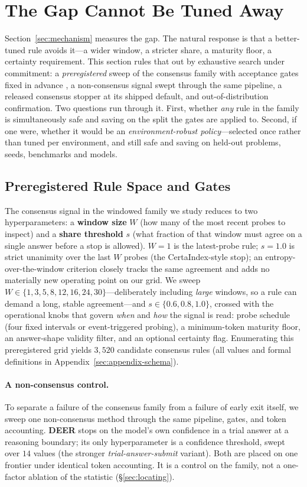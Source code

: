\section{The Gap Cannot Be Tuned Away}
\label{sec:results}

Section~\ref{sec:mechanism} measures the gap. The natural response is that a
better-tuned rule avoids it---a wider window, a stricter share, a maturity
floor, a certainty requirement. This section rules that out by exhaustive
search under commitment: a \emph{preregistered} sweep of the consensus family
with acceptance gates fixed in advance \citep{preregistration_ml}, a
non-consensus signal swept through the same pipeline, a released
consensus stopper at its shipped default, and out-of-distribution confirmation.
Two questions run through it. First, whether \emph{any} rule in the family is
simultaneously safe and saving on the split the gates are applied to. Second,
if one were, whether it would be an \emph{environment-robust policy}---selected
once rather than tuned per environment, and still safe and saving on held-out
problems, seeds, benchmarks and models.

\subsection{Preregistered Rule Space and Gates}
\label{sec:schema}
The consensus signal in the windowed family we study reduces to two
hyperparameters: a \textbf{window size} $W$ (how many of the most recent probes
to inspect) and a \textbf{share threshold} $s$ (what fraction of that window
must agree on a single answer before a stop is allowed). $W{=}1$ is the
latest-probe rule; $s{=}1.0$ is strict unanimity over the last $W$ probes (the
CertaIndex-style stop); an entropy-over-the-window criterion closely tracks the
same agreement and adds no materially new operating point on our grid. We sweep
$W\in\{1,3,5,8,12,16,24,30\}$---deliberately including \emph{large} windows, so
a rule can demand a long, stable agreement---and $s\in\{0.6,0.8,1.0\}$, crossed
with the operational knobs that govern \emph{when} and \emph{how} the signal is
read: probe schedule (four fixed intervals or event-triggered probing), a
minimum-token maturity floor, an answer-shape validity filter, and an optional
certainty flag. Enumerating this preregistered grid yields $3{,}520$ candidate
consensus rules (all values and formal definitions in
Appendix~\ref{sec:appendix-schema}).

\paragraph{A non-consensus control.}
To separate a failure of the consensus family from a failure of early exit
itself, we sweep one non-consensus method through the same pipeline, gates, and
token accounting. \textbf{DEER} \citep{deer} stops on the model's own confidence
in a trial answer at a reasoning boundary; its only hyperparameter is a
confidence threshold, swept over $14$ values (the stronger
\emph{trial-answer-submit} variant). Both are placed on one frontier under
identical token accounting. It is a control on the family, not a one-factor
ablation of the statistic (\S\ref{sec:locating}).

